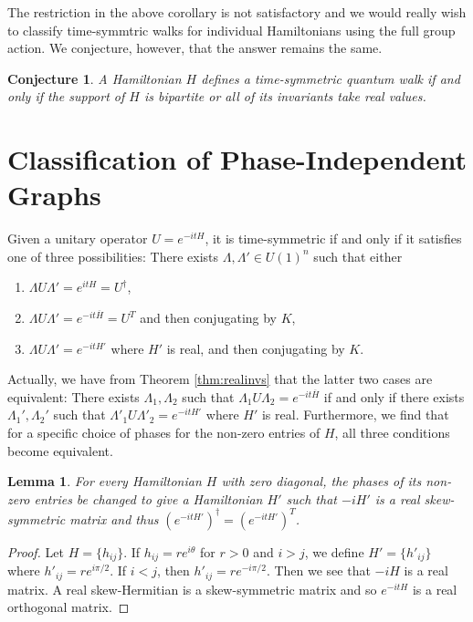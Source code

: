 \documentclass[twocolumn,superscriptaddress]{revtex4-1}
\theoremstyle{plain}
\newtheorem{lemma}[theorem]{Lemma}
\newtheorem{conjecture}[theorem]{Conjecture}
\theoremstyle{definition}
\theoremstyle{definition}
\theoremstyle{definition}
\theoremstyle{definition}
\theoremstyle{definition}
\theoremstyle{definition}
\begin{document}
The restriction in the above corollary is not satisfactory and we would really wish to classify time-symmtric walks for individual Hamiltonians using the full group action. We conjecture, however, that the answer remains the same.

\begin{conjecture}
 A Hamiltonian $H$ defines a time-symmetric quantum walk if and only if the support of $H$ is bipartite or all of its invariants take real values.
\end{conjecture}

\section{Classification of Phase-Independent Graphs}

Given a unitary operator $U=e^{-itH}$, it is time-symmetric if and only if it satisfies one of three possibilities: There exists $\Lambda,\Lambda'\in U(1)^n$ such that either
\begin{enumerate}
 \item $\Lambda U\Lambda'=e^{itH}=U^\dagger$,
 \item $\Lambda U \Lambda'=e^{-it\overline{H}}=U^T$ and then conjugating by $K$,
 \item $\Lambda U\Lambda'=e^ {-it H'}$ where $H'$ is real, and then conjugating by $K$.
\end{enumerate}
Actually, we have from Theorem \ref{thm:realinvs} that the latter two cases are equivalent: There exists $\Lambda_1,\Lambda_2$ such that $\Lambda_1 U \Lambda_2=e^{-it\overline{H}}$ if and only if there exists $\Lambda_1',\Lambda_2'$ such that $\Lambda'_1 U\Lambda'_2=e^ {-it H'}$ where $H'$ is real. Furthermore, we find that for a specific choice of phases for the non-zero entries of $H$, all three conditions become equivalent.

\begin{lemma}\label{lem:skewsymmetric}
 For every Hamiltonian $H$ with zero diagonal, the phases of its non-zero entries be changed to give a Hamiltonian $H'$ such that $-iH'$ is a real skew-symmetric matrix and thus $(e^{-itH'})^\dagger=(e^{-itH'})^T$.
\end{lemma}
\begin{proof}
 Let $H=\{h_{ij}\}$. If $h_{ij}=re^{i\theta}$ for $r>0$ and $i>j$, we define $H'=\{h'_{ij}\}$ where $h'_{ij}=re^{i\pi/2}$. If $i<j$, then $h'_{ij}=re^{-i\pi/2}$. Then we see that $-iH$ is a real matrix. A real skew-Hermitian is a skew-symmetric matrix and so $e^{-itH}$ is a real orthogonal matrix.
\end{proof}
\end{document}
